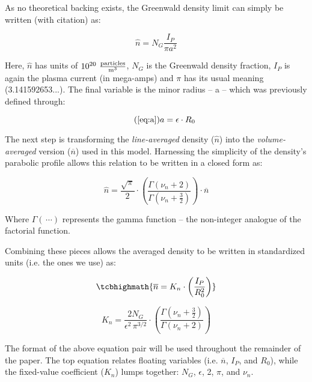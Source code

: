 As no theoretical backing exists, the Greenwald density limit can simply be written (with citation) as:

\begin{equation}
	\hat n = N_G \frac{ I_P }{ \pi a^2}
\end{equation}

Here, $\hat n$ has units of $10^{20} \ \frac{\textnormal{particles}}{\textnormal{m}^3}$, $N_G$ is the Greenwald density fraction, $I_P$ is again the plasma current (in mega-amps) and $\pi$ has its usual meaning (3.141592653...). The final variable is the minor radius -- a -- which was previously defined through:

\begin{equation}
	\tag{\ref{eq:a}}
	a = \epsilon \cdot R_0
\end{equation}

The next step is transforming the \emph{line-averaged} density ($\hat n$) into the \emph{volume-averaged} version ($\overline n$)
 used in this model. Harnessing the simplicity of the density's parabolic profile allows this relation to be written in a closed form as:
 
 \begin{equation}
 	\hat n = \frac{\sqrt{\pi}}{2} \cdot \left( \frac{\Gamma \left( \nu_n + 2 \right)}{\Gamma \left( \nu_n + \frac{3}{2} \right)} \right) \cdot \overline n 
 \end{equation}
 
 Where $\Gamma( \, \cdots)$ represents the gamma function -- the non-integer analogue of the factorial function.
 
 Combining these pieces allows the averaged density to be written in standardized units (i.e. the ones we use) as:
 
 \begin{equation}
 	\label{eq:greenwald}
 	\tcbhighmath{
 	\overline n = K_n \cdot \left( \frac{I_P}{R_0^2} \right)
 	}
 \end{equation}
 
 \begin{equation}
 	K_n = \frac{2 N_G}{\epsilon^2 \, \pi^{3/2} } \cdot \left( \frac{\Gamma \left( \nu_n + \frac{3}{2} \right)}{\Gamma \left( \nu_n + 2 \right)} \right)
\end{equation}
 
The format of the above equation pair will be used throughout the remainder of the paper. The top equation relates floating variables (i.e. $\overline n$, $I_P$, and $R_0$), while the fixed-value coefficient ($K_n$) lumps together: $N_G$, $\epsilon$, 2, $\pi$, and $\nu_n$.


